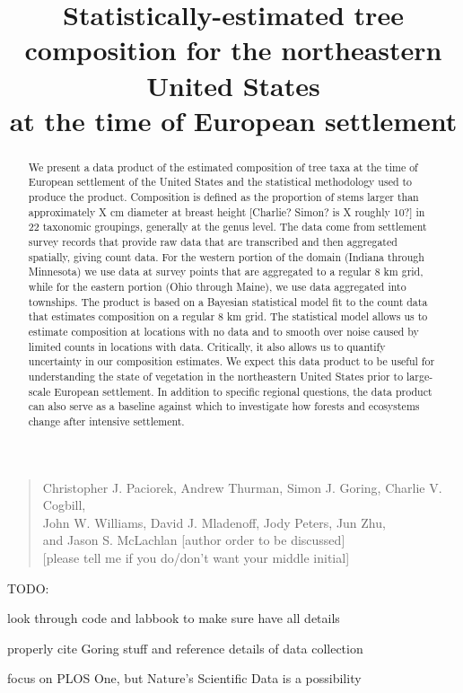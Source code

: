 \documentclass[12pt]{article}\usepackage[]{graphicx}\usepackage[]{color}
\begin{document}
\title{Statistically-estimated tree composition for the northeastern United
States \\
at the time of European settlement}
\maketitle
\begin{quote}
Christopher J. Paciorek, Andrew Thurman, Simon J. Goring, Charlie
V. Cogbill, \\
John W. Williams, David J. Mladenoff, Jody Peters, Jun Zhu, \\
and Jason S. McLachlan {[}author order to be discussed{]}\\
{[}please tell me if you do/don't want your middle initial{]}
\end{quote}
TODO:

look through code and labbook to make sure have all details

properly cite Goring stuff and reference details of data collection

focus on PLOS One, but Nature's Scientific Data is a possibility



\begin{abstract}
We present a data product of the estimated composition of tree taxa
at the time of European settlement of the United States and the statistical
methodology used to produce the product. Composition is defined as
the proportion of stems larger than approximately X cm diameter at
breast height {[}Charlie? Simon? is X roughly 10?{]} in 22 taxonomic
groupings, generally at the genus level. The data come from settlement
survey records that provide raw data that are transcribed and then
aggregated spatially, giving count data. For the western portion of
the domain (Indiana through Minnesota) we use data at survey points
that are aggregated to a regular 8 km grid, while for the eastern
portion (Ohio through Maine), we use data aggregated into townships.
The product is based on a Bayesian statistical model fit to the count
data that estimates composition on a regular 8 km grid. The statistical
model allows us to estimate composition at locations with no data
and to smooth over noise caused by limited counts in locations with
data. Critically, it also allows us to quantify uncertainty in our
composition estimates. We expect this data product to be useful for
understanding the state of vegetation in the northeastern United States
prior to large-scale European settlement. In addition to specific
regional questions, the data product can also serve as a baseline
against which to investigate how forests and ecosystems change after
intensive settlement.
\end{abstract}
\end{document}
